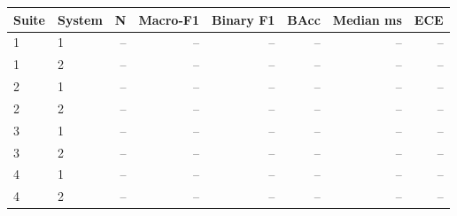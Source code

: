 \begin{tabular}{@{}llrrrrrr@{}}
\toprule
Suite & System & N & Macro-F1 & Binary F1 & BAcc & Median ms & ECE \\
\midrule
1 & 1 & -- & -- & -- & -- & -- & -- \\
1 & 2 & -- & -- & -- & -- & -- & -- \\
2 & 1 & -- & -- & -- & -- & -- & -- \\
2 & 2 & -- & -- & -- & -- & -- & -- \\
3 & 1 & -- & -- & -- & -- & -- & -- \\
3 & 2 & -- & -- & -- & -- & -- & -- \\
4 & 1 & -- & -- & -- & -- & -- & -- \\
4 & 2 & -- & -- & -- & -- & -- & -- \\
\bottomrule
\end{tabular}
